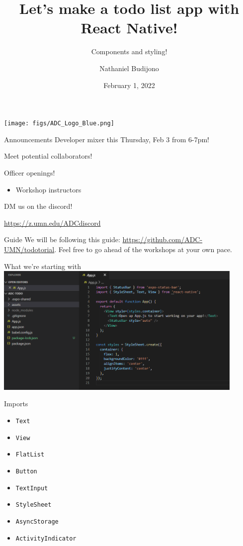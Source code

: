 \documentclass{beamer}
\title{Let's make a todo list app with React Native!}
\subtitle{Components and styling!}
\author{Nathaniel Budijono}
\date{February 1, 2022}
\institute{UMN ADC}
\begin{document}
\begin{frame}
    \titlepage
    \texttt{[image: figs/ADC\_Logo\_Blue.png]}
\end{frame}

\begin{frame}{Announcements}
	Developer mixer this Thursday, Feb 3 from 6-7pm!

	\bigskip

	Meet potential collaborators!
\end{frame}

\begin{frame}{Officer openings!}
	\begin{itemize}
		\item Workshop instructors
	\end{itemize}

	\bigskip

	DM us on the discord!

	\bigskip

	\href{https://z.umn.edu/ADCdiscord}{https://z.umn.edu/ADCdiscord}
\end{frame}

\begin{frame}{Guide}
	We will be following this guide: \href{https://github.com/ADC-UMN/todotorial}{https://github.com/ADC-UMN/todotorial}. Feel free to go ahead of the workshops at your own pace.
\end{frame}

\begin{frame}{What we're starting with}
	\centering
	\includegraphics[width=0.9\textwidth]{figs/expo-blank.png}	
\end{frame}

\begin{frame}{Imports}
	\begin{itemize}
		\item \texttt{Text}
		\item \texttt{View}
		\item \texttt{FlatList}
		\item \texttt{Button}
		\item \texttt{TextInput}
		\item \texttt{StyleSheet}
		\item \texttt{AsyncStorage}
		\item \texttt{ActivityIndicator}
	\end{itemize}
\end{frame}
\end{document}
